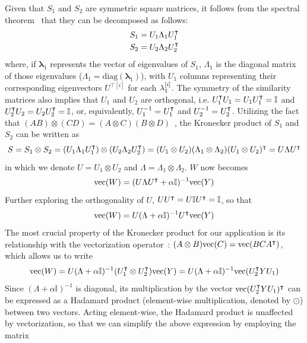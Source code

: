 Given that $S_1$ and $S_2$ are symmetric square matrices, it follows from the spectral theorem~\cite{} that they can be decomposed as follows:
%
\begin{gather*}
    S_1 = U_1 \Lambda_1 U_1^\intercal \\
    S_2 = U_2 \Lambda_2 U_2^\intercal
\end{gather*}
%
where, if $\mathbf{\lambda}_1$ represents the vector of eigenvalues of $S_1$, $\Lambda_1$ is the diagonal matrix of those eigenvalues ($\Lambda_1 = \text{diag}(\mathbf{\lambda}_1)$), with $U_1$ columns representing their corresponding eigenvectors $U^{\intercal[i]}$ for each $\mathbf{\lambda}_1^{[i]}$. The symmetry of the similarity matrices also implies that $U_1$ and $U_2$ are orthogonal, i.e. $U_1^\intercal U_1 = U_1 U_1^\intercal = \mathbb{I}$ and $U_2^\intercal U_2 = U_2 U_2^\intercal = \mathbb{I}$, or, equivalently, $U_1^{-1} = U_1^\intercal$ and $U_2^{-1} = U_2^\intercal$.
%
Utilizing the fact that $(AB) \otimes (CD) = (A \otimes C)(B \otimes D)$~\cite{}, the Kronecker product of $S_1$ and $S_2$ can be written as
%
\begin{equation}
    S = S_1 \otimes S_2
    = (U_1 \Lambda_1 U_1^\intercal) \otimes (U_2 \Lambda_2 U_2^\intercal)
    = (U_1 \otimes U_2) (\Lambda_1 \otimes \Lambda_2) (U_1 \otimes U_2)^\intercal
    = U \Lambda U^\intercal
\end{equation}
%
in which we denote $U = U_1 \otimes U_2$ and $\Lambda = \Lambda_1 \otimes \Lambda_2$.
$W$ now becomes
%
\begin{equation*}
    \text{vec}(W) = (U \Lambda U^\intercal + \alpha \mathbb{I})^{-1} \text{vec}(Y)
\end{equation*}
%
Further exploring the orthogonality of $U$, $U U^\intercal = U \mathbb{I} U^\intercal = \mathbb{I}$, so that
%
\begin{equation*}
    \text{vec}(W) = U (\Lambda + \alpha\mathbb{I})^{-1} U^\intercal \text{vec}(Y)
\end{equation*}
%
The most crucial property of the Kronecker product for our application is its relationship with the vectorization operator~\cite{}: $(A \otimes B)\text{vec} (C) = \text{vec}(BCA^\intercal)$, which allows us to write
%
\begin{equation*}
    \text{vec}(W)
    = U (\Lambda + \alpha\mathbb{I})^{-1} (U_1^\intercal \otimes U_2^\intercal) \text{vec}(Y)
    = U (\Lambda + \alpha\mathbb{I})^{-1} \text{vec}(U_2^\intercal Y U_1)
\end{equation*}
%
Since $(\Lambda + \alpha\mathbb{I})^{-1}$ is diagonal, its multiplication by the vector $\text{vec}(U_2^\intercal Y U_1)^\intercal$ can be expressed as a Hadamard product (element-wise multiplication, denoted by $\odot$) between two vectors. Acting element-wise, the Hadamard product is unaffected by vectorization, so that we can simplify the above expression by employing the matrix
